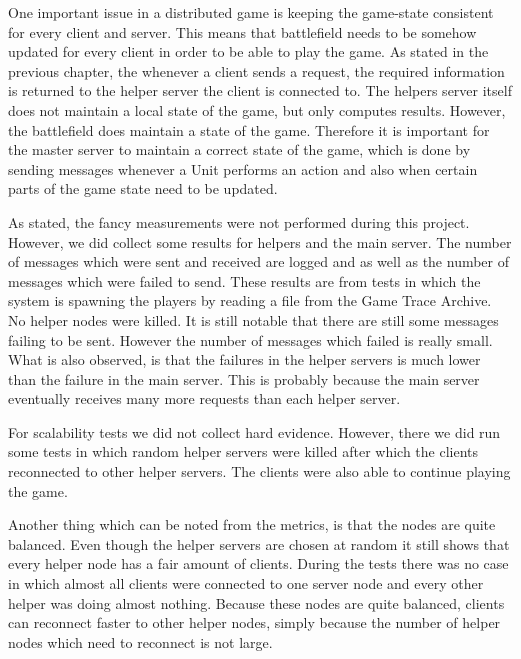 One important issue in a distributed game is keeping the game-state consistent for every client and server.
This means that battlefield needs to be somehow updated for every client in order to be able to play the game.
As stated in the previous chapter, the whenever a client sends a request, the required information is returned to the helper server the client is connected to.
The helpers server itself does not maintain a local state of the game, but only computes results.
However, the battlefield does maintain a state of the game. 
Therefore it is important for the master server to maintain a correct state of the game, which is done by sending messages whenever a Unit performs an action and also when certain parts of the game state need to be updated.

As stated, the fancy measurements were not performed during this project. 
However, we did collect some results for helpers and the main server.
The number of messages which were sent and received are logged and as well as the number of messages which were failed to send.
These results are from tests in which the system is spawning the players by reading a file from the Game Trace Archive.
No helper nodes were killed.
It is still notable that there are still some messages failing to be sent. However the number of messages which failed is really small.
What is also observed, is that the failures in the helper servers is much lower than the failure in the main server.
This is probably because the main server eventually receives many more requests than each helper server.

For scalability tests we did not collect hard evidence. 
However, there we did run some tests in which random helper servers were killed after which the clients reconnected to other helper servers.
The clients were also able to continue playing the game.

Another thing which can be noted from the metrics, is that the nodes are quite balanced.
Even though the helper servers are chosen at random it still shows that every helper node has a fair amount of clients.
During the tests there was no case in which almost all clients were connected to one server node and every other helper was doing almost nothing.
Because these nodes are quite balanced, clients can reconnect faster to other helper nodes, simply because the number of helper nodes which need to reconnect is not large.

